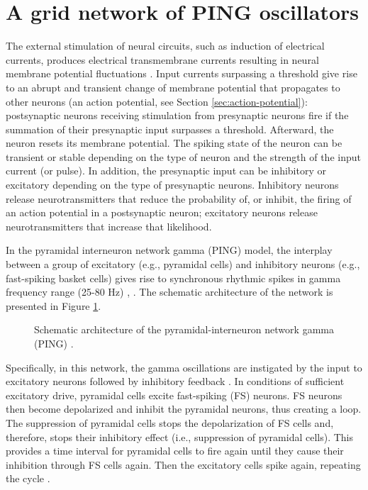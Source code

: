 \section{A grid network of PING oscillators}

The external stimulation of neural circuits, such as induction of electrical currents, produces electrical transmembrane currents resulting in neural membrane potential fluctuations \cite{IzhikevichBook2004:2}. Input currents surpassing a threshold give rise to an abrupt and transient change of membrane potential that propagates to other neurons (an action potential, see Section \ref{sec:action-potential}): postsynaptic neurons receiving stimulation from presynaptic neurons fire if the summation of their presynaptic input surpasses a threshold. Afterward, the neuron resets its membrane potential. The spiking state of the neuron can be transient or stable depending on the type of neuron and the strength of the input current (or pulse). In addition, the presynaptic input can be inhibitory or excitatory depending on the type of presynaptic neurons. Inhibitory neurons release neurotransmitters that reduce the probability of, or inhibit, the firing of an action potential in a postsynaptic neuron; excitatory neurons release neurotransmitters that increase that likelihood. 

In the pyramidal interneuron network gamma (PING) model, the interplay between a group of  excitatory (e.g., pyramidal cells) and inhibitory neurons (e.g., fast-spiking basket cells) gives rise to synchronous rhythmic spikes in gamma frequency range (25-80 Hz)  \cite{Whittington2000}, \cite{Borgers2003}. The schematic architecture of the network is presented in Figure \ref{fig:single-ping}.

\begin{figure}[!htp]
    \centering
    
    \caption[Schematic architecture of PING]{Schematic architecture of the pyramidal-interneuron network gamma (PING) \cite{Lowet2015}.}
    \label{fig:single-ping}
\end{figure}

Specifically, in this network, the gamma oscillations are instigated by the input to excitatory neurons followed by inhibitory feedback \cite{Whittington2000}. In conditions of sufficient excitatory drive, pyramidal cells excite fast-spiking (FS) neurons. FS neurons then become depolarized and inhibit the pyramidal neurons, thus creating a loop. The suppression of pyramidal cells stops the depolarization of FS cells and, therefore, stops their inhibitory effect (i.e., suppression of pyramidal cells). This provides a time interval for pyramidal cells to fire again until they cause their inhibition through FS cells again. Then the excitatory cells spike again, repeating the cycle \cite{Kopell2011}.

